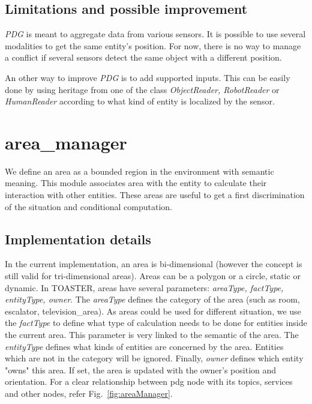 \documentclass[a4paper]{article}
\begin{document}


\subsection{Limitations and possible improvement}
\textit{PDG} is meant to aggregate data from various sensors.
It is possible to use several modalities to get the same entity's position.
For now, there is no way to manage a conflict if several sensors detect the same object with a different position.

An other way to improve \textit{PDG} is to add supported inputs. This can be easily done by using heritage from one of the class \textit{ObjectReader, RobotReader} or \textit{HumanReader} according to what kind of entity is localized by the sensor.



\section{area\_manager}
We define an area as a bounded region in the environment with semantic meaning. This module associates area with the entity to calculate their interaction with other entities. These areas are useful to get a first discrimination of the situation and conditional computation.

\subsection{Implementation details}
In the current implementation, an area is bi-dimensional (however the concept is still valid for tri-dimensional areas). Areas can be a polygon or a circle, static or dynamic. In TOASTER, areas have several parameters: \textit{areaType, factType, entityType, owner}. The \textit{areaType} defines the category of the area (such as room, escalator, television\_area). As areas could be used for different situation, we use the \textit{factType} to define what type of calculation needs to be done for entities inside the current area. This parameter is very linked to the semantic of the area. The \textit{entityType} defines what kinds of entities are concerned by the area. Entities which are not in the category will be ignored. Finally, \textit{owner} defines which entity "owns" this area. If set, the area is updated with the owner's position and orientation. For a clear relationship between pdg node with its topics, services and other nodes, refer Fig.~\ref{fig:areaManager}.
\end{document}
